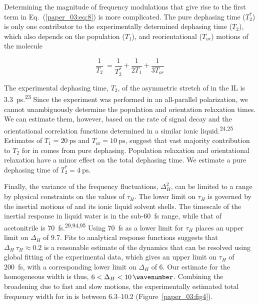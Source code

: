 \documentclass[]{article}
\begin{document}
Determining the magnitude of frequency modulations that give rise to the first term in Eq.~(\ref{paper_03:eq:8}) is more complicated. The pure dephasing time (\(T_{2}^{*}\)) is only one contributor to the experimentally determined dephasing time (\(T_{2}\)), which also depends on the population (\(T_{1}\)), and reorientational (\(T_{or}\)) motions of the molecule

\begin{equation}
  \label{paper_03:eq:9}
  \frac{1}{T_{2}}\  = \frac{1}{T_{2}^{*}} + \frac{1}{2T_{1}} + \frac{1}{3T_{or}}
\end{equation}

The experimental dephasing time, \(T_{2}\), of the asymmetric stretch of  in the \ce{[C4C1im][PF6]} IL is \SI{3.3}{\pico\second}.\textsuperscript{23} Since the experiment was performed in an all-parallel polarization, we cannot unambiguously determine the population and orientation relaxation times. We can estimate them, however, based on the rate of signal decay and the orientational correlation functions determined in a similar ionic liquid.\textsuperscript{24,25} Estimates of \(T_{1} = \SI{20}{\pico\second}\) and \(T_{\mathrm{or}} = \SI{10}{\pico\second}\), suggest that vast majority contribution to \(T_{2}\) for  in \ce{[C4C1im][PF6]} comes from pure dephasing. Population relaxation and orientational relaxation have a minor effect on the total dephasing time. We estimate a pure dephasing time of \(T_{2}^{*} = \SI{4}{\pico\second}\).

Finally, the variance of the frequency fluctuations, \(\Delta_{H}^{2}\), can be limited to a range by physical constraints on the values of \(\tau_{H}\). The lower limit on \(\tau_{H}\) is governed by the inertial motions of  and its ionic liquid solvent shells. The timescale of the inertial response in liquid water is in the sub-\SI{60}{\femto\second} range, while that of acetonitrile is \SI{70}{\femto\second}.\textsuperscript{29,94,95} Using \SI{70}{\femto\second} as a lower limit for \(\tau_{H}\) places an upper limit on \(\Delta_{H}\) of \SI{9.7}{\wavenumber}. Fits to analytical response functions suggests that \(\Delta_{H}\ \tau_{H} \approx 0.2\) is a reasonable estimate of the dynamics that can be resolved using global fitting of the experimental data, which gives an upper limit on \(\tau_{H}\) of \SI{200}{\femto\second}, with a corresponding lower limit on \(\Delta_{H}\) of \SI{6}{\wavenumber}. Our estimate for the homogeneous width is thus, \(6 < \Delta_{H} < \SI{10}{\wavenumber}\). Combining the broadening due to fast and slow motions, the experimentally estimated total frequency width for  in \ce{[C4C1im][PF6]} is between \SIrange{6.3}{10.2}{\wavenumber} (Figure~\ref{paper_03:fig4}).
\end{document}
